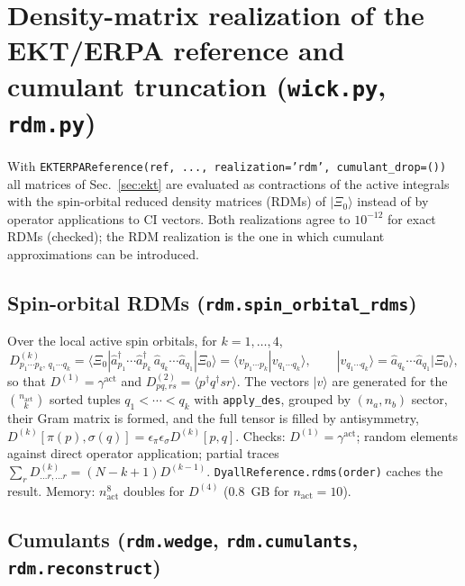 \documentclass[11pt,a4paper]{article}
\newcommand{\ket}[1]{|#1\rangle}
\newcommand{\bra}[1]{\langle#1|}
\newcommand{\braket}[1]{\langle#1\rangle}
\newcommand{\code}[1]{\texttt{#1}}
\newcommand{\act}{\mathrm{act}}
\begin{document}
\section{Density-matrix realization of the EKT/ERPA reference and cumulant truncation (\code{wick.py}, \code{rdm.py})}
\label{sec:rdm}

With \code{EKTERPAReference(ref, ..., realization='rdm', cumulant\_drop=())} all
matrices of Sec.~\ref{sec:ekt} are evaluated as contractions of the active
integrals with the spin-orbital reduced density matrices (RDMs) of
$\ket{\Xi_0}$ instead of by operator applications to CI vectors.  Both
realizations agree to $10^{-12}$ for exact RDMs (checked); the RDM
realization is the one in which cumulant approximations can be introduced.

\subsection{Spin-orbital RDMs (\code{rdm.spin\_orbital\_rdms})}

Over the local active spin orbitals, for $k=1,\ldots,4$,
\begin{equation}
  D^{(k)}_{p_1\cdots p_k,\,q_1\cdots q_k}
  =\bra{\Xi_0}\hat a_{p_1}^\dagger\cdots\hat a_{p_k}^\dagger\,\hat a_{q_k}\cdots\hat a_{q_1}\ket{\Xi_0}
  =\braket{v_{p_1\cdots p_k}|v_{q_1\cdots q_k}},\qquad
  \ket{v_{q_1\cdots q_k}}=\hat a_{q_k}\cdots\hat a_{q_1}\ket{\Xi_0},
  \label{eq:rdm-def}
\end{equation}
so that $D^{(1)}=\gamma^{\act}$ and $D^{(2)}_{pq,rs}=\braket{p^\dagger q^\dagger s r}$.
The vectors $\ket{v}$ are generated for the $\binom{n_{\act}}{k}$ sorted
tuples $q_1<\cdots<q_k$ with \code{apply\_des}, grouped by $(n_a,n_b)$ sector,
their Gram matrix is formed, and the full tensor is filled by
antisymmetry, $D^{(k)}[\pi(p),\sigma(q)]=\epsilon_\pi\epsilon_\sigma D^{(k)}[p,q]$.
Checks: $D^{(1)}=\gamma^{\act}$; random elements against direct operator
application; partial traces $\sum_rD^{(k)}_{\ldots r,\ldots r}=(N-k+1)D^{(k-1)}$.
\code{DyallReference.rdms(order)} caches the result.  Memory: $n_{\act}^{8}$
doubles for $D^{(4)}$ (0.8~GB for $n_{\act}=10$).

\subsection{Cumulants (\code{rdm.wedge}, \code{rdm.cumulants}, \code{rdm.reconstruct})}
\end{document}
